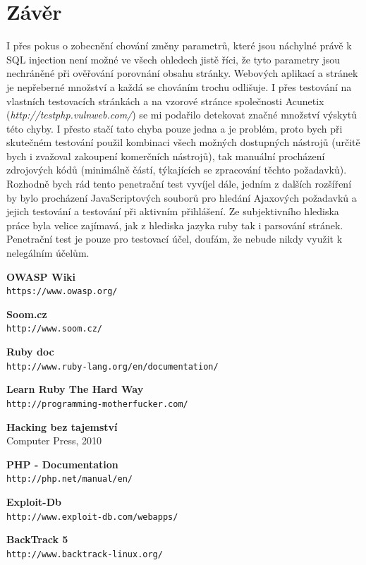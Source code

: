 \documentclass[12pt, a4paper]{report}
\begin{document}
\chapter{Závěr}
I přes pokus o zobecnění chování změny parametrů, které jsou náchylné právě k SQL injection není možné ve všech ohledech jistě říci, že tyto parametry jsou nechráněné při ověřování porovnání obsahu stránky. Webových aplikací a stránek je nepřeberné množství a každá se chováním trochu odlišuje. I přes testování na vlastních testovacích stránkách a na vzorové stránce společnosti Acunetix (\textit{http://testphp.vulnweb.com/}) se mi podařilo detekovat značné množství výskytů této chyby. I přesto stačí tato chyba pouze jedna a je problém, proto bych při skutečném testování použil kombinaci všech možných dostupných nástrojů (určitě bych i zvažoval zakoupení komerčních nástrojů), tak manuální procházení zdrojových kódů (minimálně částí, týkajících se zpracování těchto požadavků). Rozhodně bych rád tento penetrační test vyvíjel dále, jedním z dalších rozšíření by bylo procházení JavaScriptových souborů pro hledání Ajaxových požadavků a jejich testování a testování při aktivním přihlášení. Ze subjektivního hlediska práce byla velice zajímavá, jak z hlediska jazyka ruby tak i parsování stránek. Penetrační test je pouze pro testovací účel, doufám, že nebude nikdy využit k nelegálním účelům.

\begin{thebibliography}{9}
	{\bf OWASP Wiki} \\
	\texttt{https://www.owasp.org/}

	{\bf Soom.cz}\\
	\texttt{http://www.soom.cz/}

	{\bf Ruby doc}\\
	\texttt{http://www.ruby-lang.org/en/documentation/}

 {\bf Learn Ruby The Hard Way}\\
	\texttt{http://programming-motherfucker.com/}

               {\bf Hacking bez tajemství} \\
           	Computer Press, 2010

	{\bf PHP - Documentation}\\
	\texttt{http://php.net/manual/en/}

	{\bf Exploit-Db}\\
	\texttt{http://www.exploit-db.com/webapps/}

 {\bf BackTrack 5}\\
	\texttt{http://www.backtrack-linux.org/}


\end{thebibliography}
\end{document}
